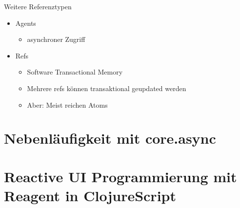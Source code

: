 \documentclass[presentation]{beamer}
\begin{document}
\begin{frame}{Weitere Referenztypen}
  \begin{itemize}
  \item Agents
    \begin{itemize}
    \item asynchroner Zugriff
    \end{itemize}
  \item Refs
    \begin{itemize}
    \item Software Transactional Memory
    \item Mehrere refs können transaktional geupdated werden
    \item Aber: Meist reichen Atoms
    \end{itemize}
  \end{itemize}
\end{frame}

\section{Nebenläufigkeit mit core.async}

\section{Reactive UI Programmierung mit Reagent in ClojureScript}
\end{document}
